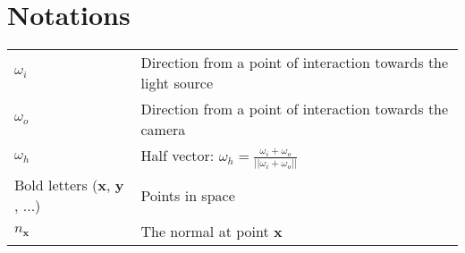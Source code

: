 \chapter*{Notations}
\begin{tabular}{ l  l }
    $\omega_i$ & Direction from a point of interaction towards the light source \\
    $\omega_o$ & Direction from a point of interaction towards the camera \\
    $\omega_h$ & Half vector: $\omega_h=\frac{\omega_i + \omega_o}{||\omega_i + \omega_o||}$ \\
    Bold letters ($\boldsymbol{x}$, $\boldsymbol{y}$, ...) & Points in space \\
    $n_{\boldsymbol{x}}$ & The normal at point $\boldsymbol{x}$ \\
\end{tabular}
